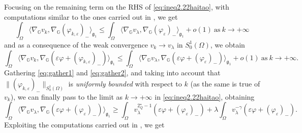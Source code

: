 \documentclass[11pt]{amsart}
\numberwithin{equation}{section} %
\theoremstyle{definition}
\def\G{\mathbb{G}}
\newcommand{\m}{\mbox}
\begin{document}
Focusing on the remaining term on the RHS of \eqref{eq:ineq2.22haitao},
with computations similar to the ones carried out in \cite[Lemma 3.4]{BadTar},
we get
\[
\int_\Omega \langle \nabla_\G v_k,\nabla_\G (\varphi_{k,\varepsilon})_-\rangle_{\mathfrak{g}_{1}}\leq
\int_\Omega\langle \nabla_\G{v_\lambda},\nabla_\G(\varphi_{\varepsilon})_-\rangle_{\mathfrak{g}_{1}} +o(1)\ \m{as}\ k\to+\infty
\]
and as a consequence of the weak convergence $v_k\to v_\lambda$ in $S_0^1(\Omega)$, we obtain
\begin{equation}\label{eq:gather2}
	\int_\Omega\langle \nabla_\G v_k,\nabla_\G(\varepsilon\varphi+(\varphi_{k,\varepsilon})_-)\rangle_{\mathfrak{g}_{1}}
	\leq \int_\Omega\langle \nabla_\G {v_\lambda},\nabla_\G(\varepsilon\varphi+(\varphi_{\varepsilon})_-)\rangle_{\mathfrak{g}_{1}} +o(1)\ \m{as}\ k\to+\infty.
\end{equation}
 Gathering \eqref{eq:gather1} and \eqref{eq:gather2}, and taking into account
that $\|(\varphi_{k,\varepsilon})_-\|_{S^{1}_{0}(\Omega)}$ is \emph{uniformly bo\-un\-ded} with respect to $k$ 
(as the same is true of $v_k$), we can finally
pass to the limit as $k\to+\infty$ in \eqref{eq:ineq2.22haitao}, obtaining
\begin{equation}
	\int_\Omega\langle \nabla_\G v_\lambda,\nabla_\G(\varepsilon\varphi+(\varphi_\varepsilon)_-)\rangle_{\mathfrak{g}_1}\geq
	\int_\Omega v_\lambda^{2^\star_Q-1}(\varepsilon\varphi+(\varphi_\varepsilon)_-)+
	\lambda\int_\Omega v_\lambda^{-\gamma}(\varepsilon\varphi+(\varphi_\varepsilon)_-).
\end{equation}
Exploiting the computations carried out in \cite[Lemma 2.6]{Haitao}, we get
\end{document}
